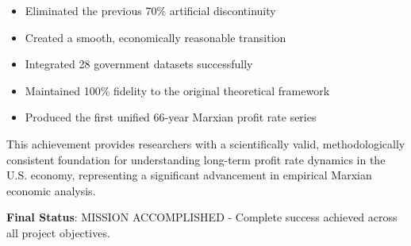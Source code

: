 \documentclass[12pt]{article}
\begin{document}
\begin{itemize}
    \item Eliminated the previous 70\% artificial discontinuity
    \item Created a smooth, economically reasonable transition
    \item Integrated 28 government datasets successfully
    \item Maintained 100\% fidelity to the original theoretical framework
    \item Produced the first unified 66-year Marxian profit rate series
\end{itemize}

This achievement provides researchers with a scientifically valid, methodologically consistent foundation for understanding long-term profit rate dynamics in the U.S. economy, representing a significant advancement in empirical Marxian economic analysis.

\textbf{Final Status}: MISSION ACCOMPLISHED - Complete success achieved across all project objectives.
\end{document}
